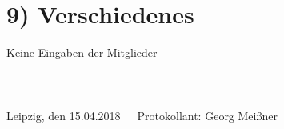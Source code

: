 \documentclass[10pt,a4paper]{scrartcl}
\newcommand{\eventdate}{15.04.2018}
\newcommand{\protokollant}{Georg Mei{\ss}ner}
\begin{document}
\section*{9) Verschiedenes}
     Keine Eingaben der Mitglieder
\\
\\
\\
\\
Leipzig, den \eventdate \ \ \ Protokollant: \protokollant
\end{document}
